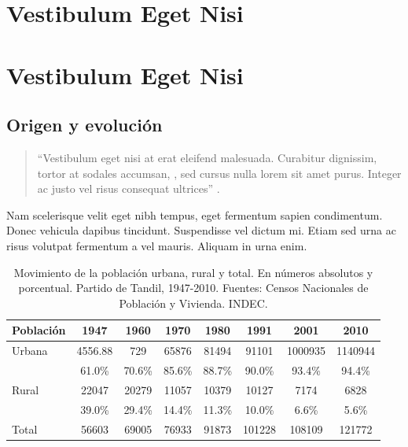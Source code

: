 \ifPDF
\chapter{Vestibulum Eget Nisi}
\setcounter{PrimPag}{\theCurrentPage}
	\else
	\ifHTMLEPUB
	\chapter{Vestibulum Eget Nisi}
	\fi
\fi

\section{Origen y evolución}

\begin{quote}
\enquote{Vestibulum eget nisi at erat eleifend malesuada. Curabitur dignissim, tortor at sodales accumsan, , sed cursus nulla lorem sit amet purus. Integer ac justo vel risus consequat ultrices} \parencite{@6445-LECUN2015}.
\end{quote}

Nam scelerisque velit eget nibh tempus, eget fermentum sapien condimentum. Donec vehicula dapibus tincidunt. Suspendisse vel dictum mi. Etiam sed urna ac risus volutpat fermentum a vel mauris. Aliquam in urna enim.

\begin{table}[!ht]
	\sf\footnotesize\setlength\tabcolsep{4pt}
	\centering
	\begin{tabular}{l | S[table-format=5.2] | S[table-format=5.0] | S[table-format=5.0] | S[table-format=5.0] | S[table-format=6.0] | S[table-format=7.0] | S[table-format=7.0]}
		\toprule
		\textbf{Población} & \textbf{1947} & \textbf{1960} & \textbf{1970} & \textbf{1980} & \textbf{1991} & \textbf{2001} & \textbf{2010} \\
		\midrule
		Urbana & 4556.88 & 729 & 65876 & 81494 & 91101 & 1000935 & 1140944 \\
		& {61.0\%} & {70.6\%} & {85.6\%} & {88.7\%} & {90.0\%} & {93.4\%} & {94.4\%} \\
		\midrule
		Rural & 22047 & 20279 & 11057 & 10379 & 10127 & 7174 & 6828 \\
		& {39.0\%} & {29.4\%} & {14.4\%} & {11.3\%} & {10.0\%} & {6.6\%} & {5.6\%} \\
		\midrule
		Total & 56603 & 69005 & 76933 & 91873 & 101228 & 108109 & 121772 \\
		\bottomrule
	\end{tabular}
	\caption{Movimiento de la población urbana, rural y total. En números absolutos y porcentual. Partido de Tandil, 1947-2010. Fuentes: Censos Nacionales de Población y Vivienda. INDEC.}\label{cap3-1}
\end{table}

